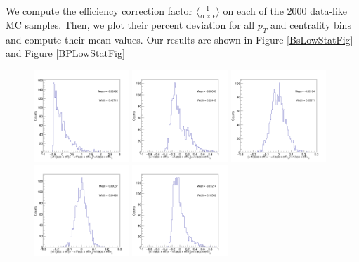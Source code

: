 We compute the efficiency correction factor $\langle \frac{1}{\alpha \times \epsilon}\rangle$ on each of the 2000 data-like MC samples. Then, we plot their percent deviation for all $p_T$ and centrality bins and compute their mean values. Our results are shown in Figure \ref{BsLowStatFig} and Figure \ref{BPLowStatFig}

\begin{figure}[h]
\begin{center}
\includegraphics[width= 0.32\textwidth]{Figures/Chapter5/BsEffONLY_0_90_0.png}
\includegraphics[width= 0.32\textwidth]{Figures/Chapter5/BsEffONLY_0_90_1.png}
\includegraphics[width= 0.32\textwidth]{Figures/Chapter5/BsEffONLY_0_90_2.png}
\includegraphics[width= 0.32\textwidth]{Figures/Chapter5/BsEffONLY_0_90_3.png}
\includegraphics[width= 0.32\textwidth]{Figures/Chapter5/BsEffONLY_0_30_-1.png}

\end{center}
\end{figure}
